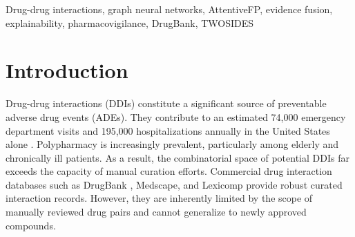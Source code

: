 \documentclass[conference]{IEEEtran}
\begin{document}
\begin{abstract}
DrugInsight is an end-to-end, interpretable drug-drug interaction (DDI) prediction system. It evaluates interaction probability and severity while generating structured clinical explanations. The system utilizes RDKit and PyTorch Geometric to process drug SMILES strings into molecular graphs. These graphs are encoded by an AttentiveFP Graph Neural Network (GNN) into fixed-length structural embeddings. The embeddings are concatenated with a comprehensive 12-dimensional pharmacological feature vector. This vector encompasses shared biological entities from DrugBank and post-market safety signals (PRR) from the TWOSIDES database. A Multi-Layer Perceptron (MLP) binary classifier processes this combined representation. The final interaction probability is computed using a tiered fusion model. This model adaptively weights curated DrugBank rules, ML classifier scores, and TWOSIDES pharmacovigilance signals to generate a unified risk index and severity classification. The system achieves a validation AUC of 0.7065 under a rigorous cold-start drug-level split. This demonstrates robust generalization to entirely unseen compounds. DrugInsight ensures high transparency through a rule-based explainer detailing metabolic competition, pharmacodynamic overlap, and explicit clinical recommendations. The system is packaged for versatile deployment via a Streamlit web interface, a FastAPI REST endpoint, and a command-line interface (CLI).
\end{abstract}

\begin{IEEEkeywords}
Drug-drug interactions, graph neural networks, AttentiveFP, evidence fusion, explainability, pharmacovigilance, DrugBank, TWOSIDES
\end{IEEEkeywords}

\section{Introduction}

Drug-drug interactions (DDIs) constitute a significant source of preventable adverse drug events (ADEs). They contribute to an estimated 74,000 emergency department visits and 195,000 hospitalizations annually in the United States alone \cite{lazarou1998}. Polypharmacy is increasingly prevalent, particularly among elderly and chronically ill patients. As a result, the combinatorial space of potential DDIs far exceeds the capacity of manual curation efforts. Commercial drug interaction databases such as DrugBank \cite{wishart2018}, Medscape, and Lexicomp provide robust curated interaction records. However, they are inherently limited by the scope of manually reviewed drug pairs and cannot generalize to newly approved compounds.
\end{document}
